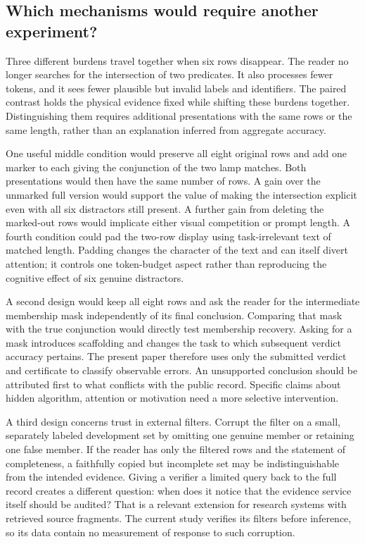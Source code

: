 \documentclass[12pt,letterpaper]{article}
\begin{document}
\subsection{Which mechanisms would require another experiment?}

Three different burdens travel together when six rows disappear. The reader no longer searches for the intersection of two predicates. It also processes fewer tokens, and it sees fewer plausible but invalid labels and identifiers. The paired contrast holds the physical evidence fixed while shifting these burdens together. Distinguishing them requires additional presentations with the same rows or the same length, rather than an explanation inferred from aggregate accuracy.

One useful middle condition would preserve all eight original rows and add one marker to each giving the conjunction of the two lamp matches. Both presentations would then have the same number of rows. A gain over the unmarked full version would support the value of making the intersection explicit even with all six distractors still present. A further gain from deleting the marked-out rows would implicate either visual competition or prompt length. A fourth condition could pad the two-row display using task-irrelevant text of matched length. Padding changes the character of the text and can itself divert attention; it controls one token-budget aspect rather than reproducing the cognitive effect of six genuine distractors.

A second design would keep all eight rows and ask the reader for the intermediate membership mask independently of its final conclusion. Comparing that mask with the true conjunction would directly test membership recovery. Asking for a mask introduces scaffolding and changes the task to which subsequent verdict accuracy pertains. The present paper therefore uses only the submitted verdict and certificate to classify observable errors. An unsupported conclusion should be attributed first to what conflicts with the public record. Specific claims about hidden algorithm, attention or motivation need a more selective intervention.

A third design concerns trust in external filters. Corrupt the filter on a small, separately labeled development set by omitting one genuine member or retaining one false member. If the reader has only the filtered rows and the statement of completeness, a faithfully copied but incomplete set may be indistinguishable from the intended evidence. Giving a verifier a limited query back to the full record creates a different question: when does it notice that the evidence service itself should be audited? That is a relevant extension for research systems with retrieved source fragments. The current study verifies its filters before inference, so its data contain no measurement of response to such corruption.
\end{document}
